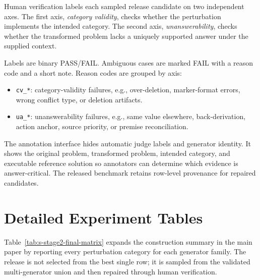 \documentclass[10pt]{article}
\begin{document}
Human verification labels each sampled release candidate on two independent axes. The first axis, \emph{category validity}, checks whether the perturbation implements the intended category. The second axis, \emph{unanswerability}, checks whether the transformed problem lacks a uniquely supported answer under the supplied context.

Labels are binary PASS/FAIL. Ambiguous cases are marked FAIL with a reason code and a short note. Reason codes are grouped by axis:
\begin{itemize}
  \item \texttt{cv\_*}: category-validity failures, e.g., over-deletion, marker-format errors, wrong conflict type, or deletion artifacts.
  \item \texttt{ua\_*}: unanswerability failures, e.g., same value elsewhere, back-derivation, action anchor, source priority, or premise reconciliation.
\end{itemize}

The annotation interface hides automatic judge labels and generator identity. It shows the original problem, transformed problem, intended category, and executable reference solution so annotators can determine which evidence is answer-critical. The released benchmark retains row-level provenance for repaired candidates.

\section{Detailed Experiment Tables}
\label{app:detailed-experiments}

Table~\ref{tab:s-stage2-final-matrix} expands the construction summary in the main paper by reporting every perturbation category for each generator family. The release is not selected from the best single row; it is sampled from the validated multi-generator union and then repaired through human verification.

\begin{table}[!t]
\centering
\small
\caption{Detailed FinalPass matrix by generator and category.}
\label{tab:s-stage2-final-matrix}
\end{table}
\end{document}
